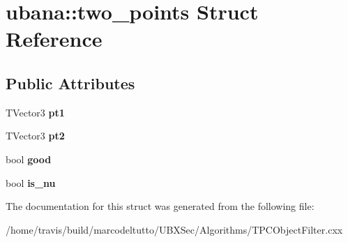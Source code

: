 \hypertarget{structubana_1_1two__points}{\section{ubana\-:\-:two\-\_\-points Struct Reference}
\label{structubana_1_1two__points}
}
\subsection*{Public Attributes}
\begin{DoxyCompactItemize}
\item 
\hypertarget{structubana_1_1two__points_a7b4a3fb2486d98f65c2d1cc0e25ca20a}{T\-Vector3 {\bfseries pt1}}\label{structubana_1_1two__points_a7b4a3fb2486d98f65c2d1cc0e25ca20a}

\item 
\hypertarget{structubana_1_1two__points_ac013f258d66c091f55489a60ada46644}{T\-Vector3 {\bfseries pt2}}\label{structubana_1_1two__points_ac013f258d66c091f55489a60ada46644}

\item 
\hypertarget{structubana_1_1two__points_a50a483a90b03dc2e75ae4b187497047f}{bool {\bfseries good}}\label{structubana_1_1two__points_a50a483a90b03dc2e75ae4b187497047f}

\item 
\hypertarget{structubana_1_1two__points_a362517d5a9d32842eed0533e9a6c14bc}{bool {\bfseries is\-\_\-nu}}\label{structubana_1_1two__points_a362517d5a9d32842eed0533e9a6c14bc}

\end{DoxyCompactItemize}


The documentation for this struct was generated from the following file\-:\begin{DoxyCompactItemize}
\item 
/home/travis/build/marcodeltutto/\-U\-B\-X\-Sec/\-Algorithms/T\-P\-C\-Object\-Filter.\-cxx\end{DoxyCompactItemize}
